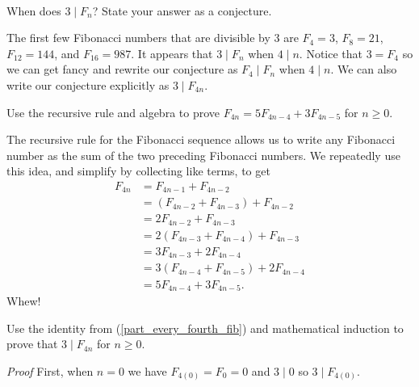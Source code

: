 \begin{exam}
\label{exam_fib_mult3}
~
    \begin{apart}
        \item \label{part_fib_conj_mult3} When does $3 \mid F_n$? State your answer as a conjecture.
            \begin{soln}
                The first few Fibonacci numbers that are divisible by 3 are $F_4=3$, $F_8=21$, $F_{12}=144$, and $F_{16}=987$.  It appears that $3 \mid F_n$ when $4 \mid n$.  Notice that $3=F_4$ so we can get fancy and rewrite our conjecture as $F_4 \mid F_n$ when $4 \mid n$.  We can also write our conjecture explicitly as $3 \mid F_{4n}$.
            \end{soln}
        \item \label{part_every_fourth_fib} Use the recursive rule and algebra to prove $F_{4n} =5F_{4n-4} + 3F_{4n-5}$ for $n \ge 0$.
            \begin{soln}
                The recursive rule for the Fibonacci sequence allows us to write any Fibonacci number as the sum of the two preceding Fibonacci numbers.  We repeatedly use this idea, and simplify by collecting like terms, to get
                    \begin{align*}
                        F_{4n} & = F_{4n-1} + F_{4n-2} \\
                        & = \left(F_{4n-2}+F_{4n-3}\right) + F_{4n-2}\\
                        & = 2F_{4n-2} + F_{4n-3} \\
                        & = 2 \left(F_{4n-3}+F_{4n-4}\right) + F_{4n-3} \\
                        & = 3 F_{4n-3}+2F_{4n-4} \\
                        & = 3 \left(F_{4n-4} + F_{4n-5}\right) +2F_{4n-4} \\
                        & = 5 F_{4n-4} + 3F_{4n-5}.
                    \end{align*}
                Whew!
            \end{soln}
        \item \label{part_fib_mult3_proof} Use the identity from (\ref{part_every_fourth_fib}) and mathematical induction to prove that $3 \mid F_{4n}$ for $n \ge 0$.
        \begin{soln}
            \emph{Proof}  First, when $n=0$ we have $F_{4(0)}=F_0=0$ and $3 \mid 0$ so $3 \mid F_{4(0)}$.


\end{soln}
\end{apart}
\end{exam}
